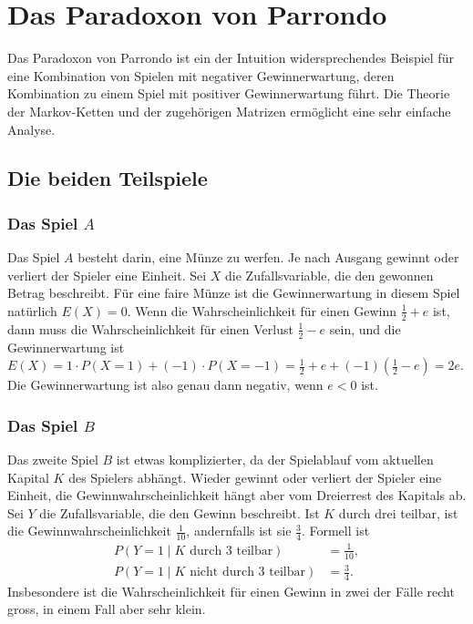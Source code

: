 %
%
%
\section{Das Paradoxon von Parrondo
\label{buch:section:paradoxon-von-parrondo}}
Das Paradoxon von Parrondo ist ein der Intuition widersprechendes
Beispiel für eine Kombination von Spielen mit negativer Gewinnerwartung,
deren Kombination zu einem Spiel mit positiver Gewinnerwartung führt.
Die Theorie der Markov-Ketten und der zugehörigen Matrizen ermöglicht
eine sehr einfache Analyse.

%
%
\subsection{Die beiden Teilspiele
\label{buch:subsection:teilspiele}}


\subsubsection{Das Spiel $A$}
Das Spiel $A$ besteht darin, eine Münze zu werfen.
Je nach Ausgang gewinnt oder verliert der Spieler eine Einheit.
Sei $X$ die Zufallsvariable, die den gewonnen Betrag beschreibt.
Für eine faire Münze ist die Gewinnerwartung in diesem Spiel natürlich
$E(X)=0$.
Wenn die Wahrscheinlichkeit für einen Gewinn $\frac12+e$ ist, dann muss
die Wahrscheinlichkeit für einen Verlust $\frac12-e$ sein, und die 
Gewinnerwartung ist
\(
E(X)
=
1\cdot P(X=1) + (-1)\cdot P(X=-1)
=
\frac12+e + (-1)(\frac12-e)
=
2e.
\)
Die Gewinnerwartung ist also genau dann negativ, wenn $e<0$ ist.

\subsubsection{Das Spiel $B$}
Das zweite Spiel $B$ ist etwas komplizierter, da der Spielablauf vom 
aktuellen Kapital $K$ des Spielers abhängt.
%
Wieder gewinnt oder verliert der Spieler eine Einheit,
die Gewinnwahrscheinlichkeit hängt aber vom Dreierrest des Kapitals ab.
Sei $Y$ die Zufallsvariable, die den Gewinn beschreibt.
Ist $K$ durch drei teilbar, ist die Gewinnwahrscheinlichkeit $\frac1{10}$,
andernfalls ist sie $\frac34$.
Formell ist
\begin{equation}
\begin{aligned}
P(Y=1\mid \text{$K$ durch $3$ teilbar}) &=  \frac{1}{10},
\\
P(Y=1\mid \text{$K$ nicht durch $3$ teilbar}) &= \frac{3}{4}.
\end{aligned}
\label{buch:wahrscheinlichkeit:eqn:Bwahrscheinlichkeiten}
\end{equation}
Insbesondere ist die Wahrscheinlichkeit für einen Gewinn in zwei der
Fälle recht gross, in einem Fall aber sehr klein.

